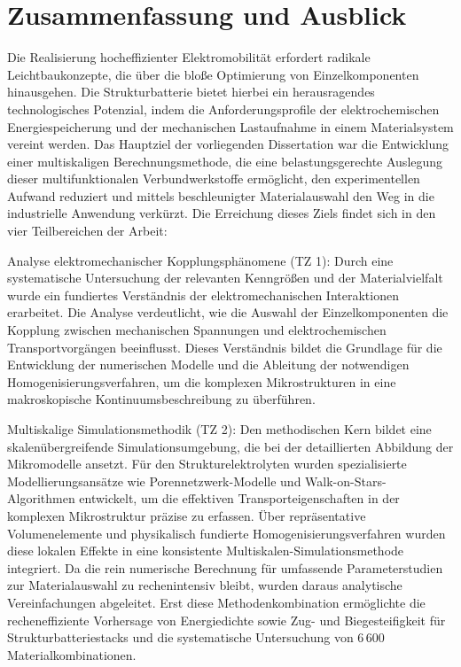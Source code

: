 \chapter{Zusammenfassung und Ausblick}\label{sec:zusammenfassung}


Die Realisierung hocheffizienter Elektromobilität erfordert radikale Leichtbaukonzepte, die über die bloße Optimierung von Einzelkomponenten hinausgehen. Die Strukturbatterie bietet hierbei ein herausragendes technologisches Potenzial, indem die Anforderungsprofile der elektrochemischen Energiespeicherung und der mechanischen Lastaufnahme in einem Materialsystem vereint werden. Das Hauptziel der vorliegenden Dissertation war die Entwicklung einer multiskaligen Berechnungsmethode, die eine belastungsgerechte Auslegung dieser multifunktionalen Verbundwerkstoffe ermöglicht, den experimentellen Aufwand reduziert und mittels beschleunigter Materialauswahl den Weg in die industrielle Anwendung verkürzt. Die Erreichung dieses Ziels findet sich in den vier Teilbereichen der Arbeit:

Analyse elektromechanischer Kopplungsphänomene (TZ 1): Durch eine systematische Untersuchung der relevanten Kenngrößen und der Materialvielfalt wurde ein fundiertes Verständnis der elektromechanischen Interaktionen erarbeitet. Die Analyse verdeutlicht, wie die Auswahl der Einzelkomponenten die Kopplung zwischen mechanischen Spannungen und elektrochemischen Transportvorgängen beeinflusst. Dieses Verständnis bildet die Grundlage für die Entwicklung der numerischen Modelle und die Ableitung der notwendigen Homogenisierungsverfahren, um die komplexen Mikrostrukturen in eine makroskopische Kontinuumsbeschreibung zu überführen.

Multiskalige Simulationsmethodik (TZ 2): Den methodischen Kern bildet eine skalenübergreifende Simulationsumgebung, die bei der detaillierten Abbildung der Mikromodelle ansetzt. Für den Strukturelektrolyten wurden spezialisierte Modellierungsansätze wie Porennetzwerk-Modelle und Walk-on-Stars-Algorithmen entwickelt, um die effektiven Transporteigenschaften in der komplexen Mikrostruktur präzise zu erfassen. Über repräsentative Volumenelemente und physikalisch fundierte Homogenisierungsverfahren wurden diese lokalen Effekte in eine konsistente Multiskalen-Simulationsmethode integriert. Da die rein numerische Berechnung für umfassende Parameterstudien zur Materialauswahl zu rechenintensiv bleibt, wurden daraus analytische Vereinfachungen abgeleitet. Erst diese Methodenkombination ermöglichte die recheneffiziente Vorhersage von Energiedichte sowie Zug- und Biegesteifigkeit für Strukturbatteriestacks und die systematische Untersuchung von 6\,600 Materialkombinationen.

